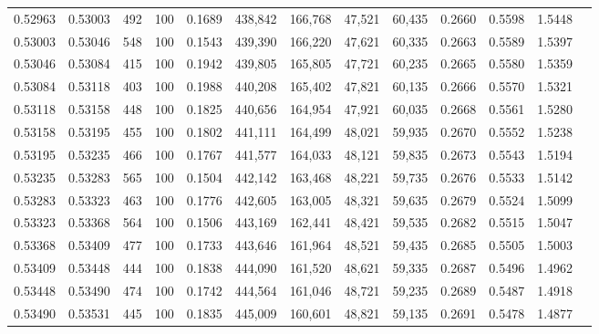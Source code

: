 \begin{tabular}{rrrrrrrrrrrrr}
0.52963 & 0.53003 &   492 & 100 &                                     0.1689 & 438,842 & 166,768 &  47,521 &  60,435 & 0.2660 & 0.5598 & 1.5448 \\
0.53003 & 0.53046 &   548 & 100 &                                     0.1543 & 439,390 & 166,220 &  47,621 &  60,335 & 0.2663 & 0.5589 & 1.5397 \\
0.53046 & 0.53084 &   415 & 100 &                                     0.1942 & 439,805 & 165,805 &  47,721 &  60,235 & 0.2665 & 0.5580 & 1.5359 \\
0.53084 & 0.53118 &   403 & 100 &                                     0.1988 & 440,208 & 165,402 &  47,821 &  60,135 & 0.2666 & 0.5570 & 1.5321 \\
0.53118 & 0.53158 &   448 & 100 &                                     0.1825 & 440,656 & 164,954 &  47,921 &  60,035 & 0.2668 & 0.5561 & 1.5280 \\
0.53158 & 0.53195 &   455 & 100 &                                     0.1802 & 441,111 & 164,499 &  48,021 &  59,935 & 0.2670 & 0.5552 & 1.5238 \\
0.53195 & 0.53235 &   466 & 100 &                                     0.1767 & 441,577 & 164,033 &  48,121 &  59,835 & 0.2673 & 0.5543 & 1.5194 \\
0.53235 & 0.53283 &   565 & 100 &                                     0.1504 & 442,142 & 163,468 &  48,221 &  59,735 & 0.2676 & 0.5533 & 1.5142 \\
0.53283 & 0.53323 &   463 & 100 &                                     0.1776 & 442,605 & 163,005 &  48,321 &  59,635 & 0.2679 & 0.5524 & 1.5099 \\
0.53323 & 0.53368 &   564 & 100 &                                     0.1506 & 443,169 & 162,441 &  48,421 &  59,535 & 0.2682 & 0.5515 & 1.5047 \\
0.53368 & 0.53409 &   477 & 100 &                                     0.1733 & 443,646 & 161,964 &  48,521 &  59,435 & 0.2685 & 0.5505 & 1.5003 \\
0.53409 & 0.53448 &   444 & 100 &                                     0.1838 & 444,090 & 161,520 &  48,621 &  59,335 & 0.2687 & 0.5496 & 1.4962 \\
0.53448 & 0.53490 &   474 & 100 &                                     0.1742 & 444,564 & 161,046 &  48,721 &  59,235 & 0.2689 & 0.5487 & 1.4918 \\
0.53490 & 0.53531 &   445 & 100 &                                     0.1835 & 445,009 & 160,601 &  48,821 &  59,135 & 0.2691 & 0.5478 & 1.4877 \\

\end{tabular}
